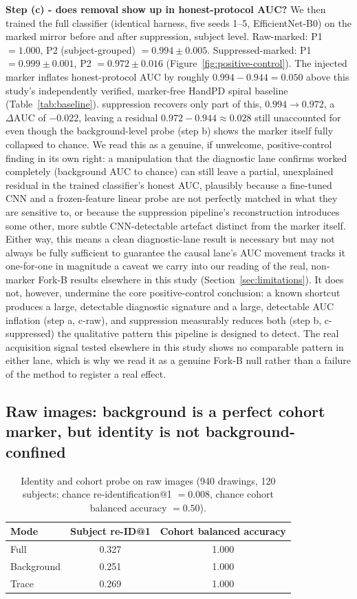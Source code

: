 \documentclass[3p,final,10pt]{elsarticle}
\let\oldsubsection\subsection
\renewcommand{\subsection}{\FloatBarrier\oldsubsection}
\begin{document}
\textbf{Step (c) - does removal show up in honest-protocol AUC?} We then
trained the full classifier (identical harness, five seeds 1--5,
EfficientNet-B0) on the marked mirror before and after suppression, subject
level. Raw-marked: P1 $=1.000$, P2 (subject-grouped) $=0.994\pm0.005$.
Suppressed-marked: P1 $=0.999\pm0.001$, P2 $=0.972\pm0.016$
(Figure~\ref{fig:positive-control}). The injected
marker inflates honest-protocol AUC by roughly $0.994-0.944=0.050$ above
this study's independently verified, marker-free HandPD spiral baseline
(Table~\ref{tab:baseline}). suppression recovers only part of this,
$0.994\to0.972$, a $\Delta\mathrm{AUC}$ of $-0.022$, leaving a residual
$0.972-0.944\approx0.028$ still unaccounted for even though the
background-level probe (step b) shows the marker itself fully collapsed to
chance. We read this as a genuine, if unwelcome, positive-control finding
in its own right: a manipulation that the diagnostic lane confirms worked
completely (background AUC to chance) can still leave a partial,
unexplained residual in the trained classifier's honest AUC, plausibly
because a fine-tuned CNN and a frozen-feature linear probe are not
perfectly matched in what they are sensitive to, or because the
suppression pipeline's reconstruction introduces some other, more subtle
CNN-detectable artefact distinct from the marker itself. Either way, this
means a clean diagnostic-lane result is necessary but may not always be
fully sufficient to guarantee the causal lane's AUC movement tracks it
one-for-one in magnitude a caveat we carry into our reading of the real,
non-marker Fork-B results elsewhere in this study (Section~\ref{sec:limitations}).
It does not, however, undermine the core positive-control conclusion: a
known shortcut produces a large, detectable diagnostic signature and a
large, detectable AUC inflation (step a, c-raw), and suppression measurably
reduces both (step b, c-suppressed) the qualitative pattern this
pipeline is designed to detect. The real acquisition signal tested
elsewhere in this study shows no comparable pattern in either lane, which
is why we read it as a genuine Fork-B null rather than a failure of the
method to register a real effect.

\subsection{Raw images: background is a perfect cohort marker, but identity is not background-confined}
\label{sec:cohort-marker}

\begin{table}[H]
\centering
\caption{Identity and cohort probe on raw images (940 drawings, 120
subjects; chance re-identification@1 $=0.008$, chance cohort balanced
accuracy $=0.50$).}
\label{tab:probe-raw}
\begin{tabular}{lcc}
\toprule
Mode & Subject re-ID@1 & Cohort balanced accuracy \\
\midrule
Full        & 0.327 & 1.000 \\
Background  & 0.251 & 1.000 \\
Trace       & 0.269 & 1.000 \\
\bottomrule
\end{tabular}
\end{table}
\end{document}
